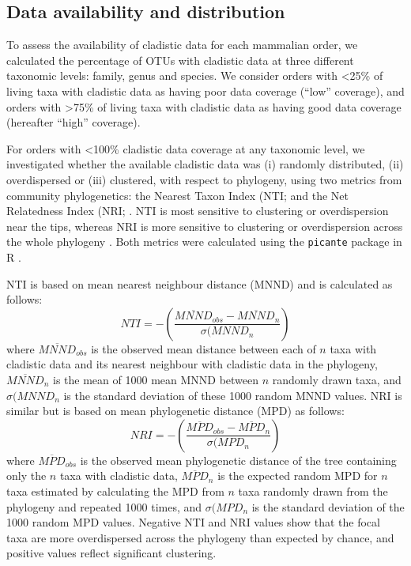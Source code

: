 \subsection{Data availability and distribution}
To assess the availability of cladistic data for each mammalian order, we calculated the percentage of OTUs with cladistic data at three different taxonomic levels: family, genus and species.
We consider orders with \textless 25\% of living taxa with cladistic data as having poor data coverage (``low'' coverage), and orders with \textgreater 75\% of living taxa with cladistic data as having good data coverage (hereafter ``high'' coverage). 

For orders with \textless 100\% cladistic data coverage at any taxonomic level, we investigated whether the available cladistic data was (i) randomly distributed, (ii) overdispersed or (iii) clustered, with respect to phylogeny, using two metrics from community phylogenetics: the Nearest Taxon Index (NTI; \citep{webb2002phylogenies} and the Net Relatedness Index (NRI; \citep{webb2002phylogenies}. 
NTI is most sensitive to clustering or overdispersion near the tips, whereas NRI is more sensitive to clustering or overdispersion across the whole phylogeny \citep{Cooper2008}. 
Both metrics were calculated using the \texttt{picante} package in R \citep{picante,R}.

NTI \citep{webb2002phylogenies} is based on mean nearest neighbour distance (MNND) and is calculated as follows:
  \begin{equation}
    NTI=-\left(\frac{\overline{MNND}_{obs}-\overline{MNND}_{n}}{\sigma(MNND_{n}}\right)
  \end{equation}
where $\overline{MNND}_{obs}$ is the observed mean distance between each of $n$ taxa with cladistic data and its nearest neighbour with cladistic data in the phylogeny, 
$\overline{MNND}_{n}$ is the mean of 1000 mean MNND between $n$ randomly drawn taxa, and $\sigma(MNND_{n}$ is the standard deviation of these 1000 random MNND values.
NRI is similar but is based on mean phylogenetic distance (MPD) as follows:
  \begin{equation}
    NRI=-\left(\frac{\overline{MPD}_{obs}-\overline{MPD}_{n}}{\sigma(MPD_{n}}\right)
  \end{equation}
where $\overline{MPD}_{obs}$ is the observed mean phylogenetic distance of the tree containing only the $n$ taxa with cladistic data, $\overline{MPD}_{n}$ is the expected random MPD for $n$ taxa estimated by calculating the MPD from $n$ taxa randomly drawn from the phylogeny and repeated 1000 times, and $\sigma(MPD_{n}$ is the standard deviation of the 1000 random MPD values. %
Negative NTI and NRI values show that the focal taxa are more overdispersed across the phylogeny than expected by chance, and positive values reflect significant clustering.

